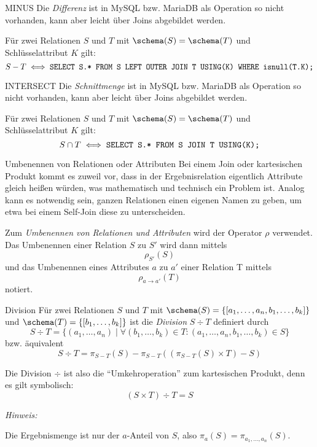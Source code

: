 \begin{sql}{MINUS}
    Die \emph{Differenz} ist in MySQL bzw. MariaDB als Operation so nicht vorhanden, kann aber leicht über Joins abgebildet werden.

    Für zwei Relationen $S$ und $T$ mit $\schema(S) = \schema(T)$ und Schlüsselattribut $K$ gilt:
    \[
        S - T \iff \text{\texttt{SELECT S.* FROM S LEFT OUTER JOIN T USING(K) WHERE isnull(T.K);}}
    \]
\end{sql}

\begin{sql}{INTERSECT}
    Die \emph{Schnittmenge} ist in MySQL bzw. MariaDB als Operation so nicht vorhanden, kann aber leicht über Joins abgebildet werden.

    Für zwei Relationen $S$ und $T$ mit $\schema(S) = \schema(T)$ und Schlüsselattribut $K$ gilt:
    \[
        S \cap T \iff \text{\texttt{SELECT S.* FROM S JOIN T USING(K);}}
    \]
\end{sql}

\begin{defi}{Umbenennen von Relationen oder Attributen}
    Bei einem Join oder kartesischen Produkt kommt es zuweil vor, dass in der Ergebnisrelation eigentlich Attribute gleich heißen würden, was mathematisch und technisch ein Problem ist.
    Analog kann es notwendig sein, ganzen Relationen einen eigenen Namen zu geben, um etwa bei einem Self-Join diese zu unterscheiden.


    Zum \emph{Umbenennen von Relationen und Attributen} wird der Operator $\rho$ verwendet.
    Das Umbenennen einer Relation $S$ zu $S'$ wird dann mittels
    \[
        \rho_{S'}(S)
    \]
    und das Umbenennen eines Attributes $a$ zu $a'$ einer Relation T mittels
    \[
        \rho_{a \to a'}(T)
    \]
    notiert.
\end{defi}

\begin{defi}{Division}
    Für zwei Relationen $S$ und $T$ mit $\schema(S) = \{ [ a_1, \ldots, a_n, b_1, \ldots, b_k ] \}$ und $\schema(T) = \{ [ b_1, \ldots, b_k ] \}$ ist die \emph{Division} $S \div T$ definiert durch
    \[
        S \div T = \{ (a_1, \ldots, a_n) \mid \forall (b_1, \ldots, b_k) \in T : (a_1, \ldots, a_n, b_1, \ldots, b_k) \in S \}
    \]
    bzw. äquivalent
    \[
        S \div T = \pi_{S-T}(S) - \pi_{S-T}( (\pi_{S-T}(S) \times T) - S )
    \]

    Die Division $\div$ ist also die \enquote{Umkehroperation} zum kartesischen Produkt, denn es gilt symbolisch:
    \[
        (S \times T) \div T = S
    \]

    \emph{Hinweis:}

    Die Ergebnismenge ist nur der $a$-Anteil von $S$, also $\pi_a(S) = \pi_{a_1, \ldots, a_n}(S)$.
\end{defi}

